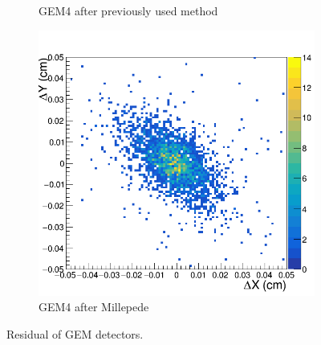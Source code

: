 \begin{figure}[h!]
\begin{subfigure}[l]{.45\textwidth}
   \caption{GEM4 after previously used method}
   \label{fig:GEM4_after_prev}
 \end{subfigure}
 \begin{subfigure}[r]{.45\textwidth}
   \centering
   \includegraphics[width=\linewidth]{thesis_figures/alignment/Run_3211_after_millepede/square/GEM4.png}
   \caption{GEM4 after Millepede}
 \end{subfigure}
 \caption{Residual of GEM detectors.}
\end{figure}


